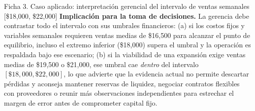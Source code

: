 {\begin{fichainvestigacion}{Ficha 3. Caso aplicado: interpretación gerencial del intervalo de ventas semanales [\$18,000, \$22,000]}
\textbf{Implicación para la toma de decisiones.} La gerencia debe contrastar todo el intervalo con sus umbrales financieros: (a) si los costos fijos y variables semanales requieren ventas medias de \$16,500 para alcanzar el punto de equilibrio, incluso el extremo inferior (\$18,000) supera el umbral y la operación es respaldada bajo ese escenario; (b) si la viabilidad de una expansión exige ventas medias de \$19,500 o \$21,000, ese umbral cae \textit{dentro} del intervalo $[\$18,000, \$22,000]$, lo que advierte que la evidencia actual no permite descartar pérdidas y aconseja mantener reservas de liquidez, negociar contratos flexibles con proveedores o reunir más observaciones independientes para estrechar el margen de error antes de comprometer capital fijo.
\end{fichainvestigacion}

}
